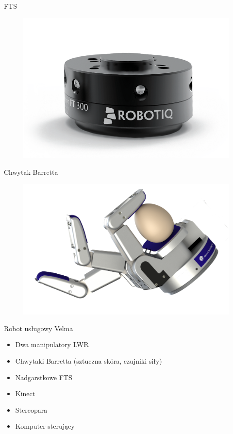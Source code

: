 \documentclass{beamer}
\begin{document}
\begin{frame}{FTS}
\begin{figure}[h]
	\centering
	\includegraphics[scale=0.35]{fts}
\end{figure}
\end{frame}

\begin{frame}{Chwytak Barretta}
\begin{figure}[h]
	\centering
	\includegraphics[scale=0.5]{barrett}
\end{figure}
\end{frame}

\begin{frame}{Robot usługowy Velma}
\begin{itemize}
	\item Dwa manipulatory LWR
	\item Chwytaki Barretta (sztuczna skóra, czujniki siły)
	\item Nadgarstkowe FTS
	\item Kinect
	\item Stereopara
	\item Komputer sterujący
\end{itemize}
\end{frame}
\end{document}
